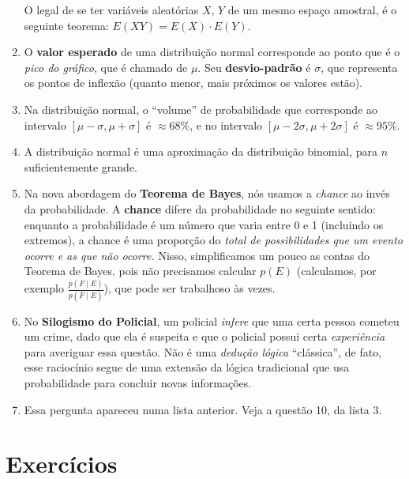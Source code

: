 \documentclass{article}
\begin{document}
\begin{enumerate}
        O legal de se ter variáveis aleatórias \( X \), \( Y \) de um mesmo espaço amostral, é o seguinte teorema: \( E(XY) = E(X) \cdot E(Y) \).

    \item O \textbf{valor esperado} de uma distribuição normal corresponde ao ponto que é o \textit{pico do gráfico}, que é chamado de \( \mu \). Seu \textbf{desvio-padrão} é \( \sigma \), que representa os pontos de inflexão (quanto menor, mais próximos os valores estão).

    \item Na distribuição normal, o ``volume'' de probabilidade que corresponde ao intervalo \( [\mu - \sigma, \mu + \sigma] \) é \( \approx 68\% \), e no intervalo \( [\mu - 2\sigma, \mu + 2\sigma] \) é \( \approx 95\% \).

    \item A distribuição normal é uma aproximação da distribuição binomial, para \( n \) suficientemente grande.

    \item Na nova abordagem do \textbf{Teorema de Bayes}, nós usamos a \textit{chance} ao invés da probabilidade. A \textbf{chance} difere da probabilidade no seguinte sentido: enquanto a probabilidade é um número que varia entre 0 e 1 (incluindo os extremos), a chance é uma proporção do \textit{total de possibilidades que um evento ocorre e as que não ocorre.} Nisso, simplificamos um pouco as contas do Teorema de Bayes, pois não precisamos calcular \( p(E) \) (calculamos, por exemplo \( \frac{p(F \mid E)}{p(\overline{F} \mid E)} \)), que pode ser trabalhoso às vezes.

    \item No \textbf{Silogismo do Policial}, um policial \textit{infere} que uma certa pessoa cometeu um crime, dado que ela é suspeita e que o policial possui certa \textit{experiência} para averiguar essa questão. Não é uma \textit{dedução lógica} ``clássica'', de fato, esse raciocínio segue de uma extensão da lógica tradicional que usa probabilidade para concluir novas informações. 

    \item Essa pergunta apareceu numa lista anterior. Veja a questão 10, da lista 3.

\end{enumerate}

\section*{Exercícios}
\end{document}
